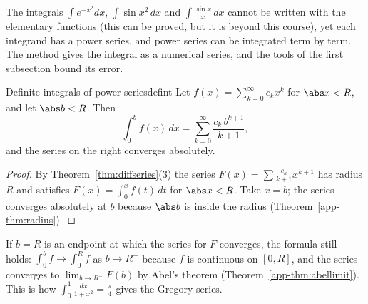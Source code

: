 \documentclass[11pt]{article}
\begin{document}
The integrals $\int e^{-x^2}dx$, $\int\sin x^2\,dx$ and $\int\frac{\sin x}x\,dx$ cannot be written with the elementary functions (this can be proved, but it is beyond this course), yet each integrand has a power series, and power series can be integrated term by term. The method gives the integral as a numerical series, and the tools of the first subsection bound its error.

\begin{thm}{Definite integrals of power series}{defint}
Let $f(x)=\sum_{k=0}^\infty c_kx^k$ for $\abs x<R$, and let $\abs b<R$. Then
\[
\int_0^bf(x)\,dx=\sum_{k=0}^\infty\frac{c_k\,b^{k+1}}{k+1},
\]
and the series on the right converges absolutely.
\end{thm}
\begin{proof}
By Theorem~\ref{thm:diffseries}(3) the series $F(x)=\sum\frac{c_k}{k+1}x^{k+1}$ has radius $R$ and satisfies $F(x)=\int_0^xf(t)\,dt$ for $\abs x<R$. Take $x=b$; the series converges absolutely at $b$ because $\abs b$ is inside the radius (Theorem~\ref{app-thm:radius}).
\end{proof}

If $b=R$ is an endpoint at which the series for $F$ converges, the formula still holds: $\int_0^bf\to\int_0^Rf$ as $b\to R^-$ because $f$ is continuous on $[0,R]$, and the series converges to $\lim_{b\to R^-}F(b)$ by Abel's theorem (Theorem~\ref{app-thm:abellimit}). This is how $\int_0^1\frac{dx}{1+x^2}=\frac\pi4$ gives the Gregory series.
\end{document}
